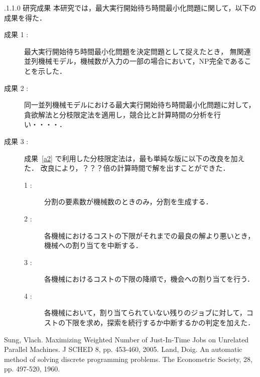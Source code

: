 \documentclass[oneside, 10pt, twocolumn]{jarticle}
\makeatletter
\def\section{\@startsection {section}{1}{\z@}{-3.5ex plus -1ex minus
-.2ex}{2.3 ex plus .2ex}{\large\bf}}
\renewcommand{\section}{
\@startsection{section}{1}{\z@}
{.1\Cvs \@plus.0\Cdp \@minus.1\Cdp}%
{.1\Cvs \@plus.1\Cdp \@minus.0\Cdp}%
{\reset@font\large\bfseries}}      %
\makeatother
\begin{document}
\section{研究成果}
本研究では，最大実行開始待ち時間最小化問題に関して，以下の成果を得た．
\begin{description}
  \item[成果 1 : ]
  最大実行開始待ち時間最小化問題を決定問題として捉えたとき，
  無関連並列機械モデル，機械数が入力の一部の場合において，NP完全であることを示した．
  \item[成果 2 : ]\label{a2}
  同一並列機械モデルにおける最大実行開始待ち時間最小化問題に対して，貪欲解法と分枝限定法を適用し，競合比と計算時間の分析を行い・・・・．
  \item[成果 3 : ]
  成果~\ref{a2} で利用した分枝限定法は，最も単純な版に以下の改良を加えた．
  改良により，？？？倍の計算時間で解を出すことができた．
  \begin{description}
    \item[1 : ] 分割の要素数が機械数のときのみ，分割を生成する．
    \item[2 : ] 各機械におけるコストの下限がそれまでの最良の解より悪いとき，機械への割り当てを中断する．
    \item[3 : ] 各機械におけるコストの下限の降順で，機会への割り当てを行う．
    \item[4 : ] 各機械において，割り当てられていない残りのジョブに対して，コストの下限を求め，探索を続行するか中断するかの判定を加えた．
  \end{description}
\end{description}

\begin{thebibliography}{9} %
Sung, Vlach.
Maximizing Weighted Number of Just-In-Time Jobs on Unrelated Parallel Machines. J SCHED 8, pp. 453-460, 2005.
Land, Doig.
An automatic method of solving discrete programming problems.
The Econometric Society, 28, pp. 497-520, 1960.
\end{thebibliography}
\end{document}
